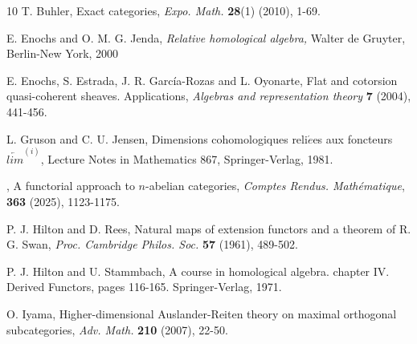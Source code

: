 \documentclass[11pt,a4paper]{amsart}
\theoremstyle{definition}
\theoremstyle{plain}
\theoremstyle{definition}
\numberwithin{equation}{section}
\begin{document}
\begin{thebibliography}{10}
{\sc T. Buhler}, Exact categories, {\em Expo. Math.} {\bf 28}(1) (2010), 1-69.

 {\sc E. Enochs and O. M. G. Jenda, }{\sl Relative homological algebra, }
Walter de Gruyter, Berlin-New York, 2000

{\sc E. Enochs, S. Estrada, J. R. García-Rozas and L. Oyonarte}, Flat and cotorsion quasi-coherent sheaves. Applications,
{\em Algebras and representation theory} {\bf 7} (2004), 441-456.


{\sc L. Gruson and C. U. Jensen,}  Dimensions cohomologiques reli$\acute{e}$es aux
foncteurs $\underleftarrow{lim}^{(i)}$, Lecture Notes in Mathematics 867, Springer-Verlag, 1981.

, A functorial approach to $n$-abelian categories, {\em   Comptes Rendus. Mathématique}, {\bf 363} (2025), 1123-1175.





{\sc P. J. Hilton and D. Rees,} Natural maps of extension functors and a theorem of R. G. Swan, {\em Proc. Cambridge
Philos. Soc.} {\bf 57} (1961), 489-502.

{\sc P. J. Hilton and U. Stammbach,} A course in homological algebra. chapter IV. Derived Functors,
pages 116-165. Springer-Verlag, 1971.


{\sc O. Iyama,} Higher-dimensional Auslander-Reiten theory on maximal orthogonal subcategories,
{\em Adv. Math.} {\bf 210}  (2007), 22-50.



\end{thebibliography}
\end{document}
